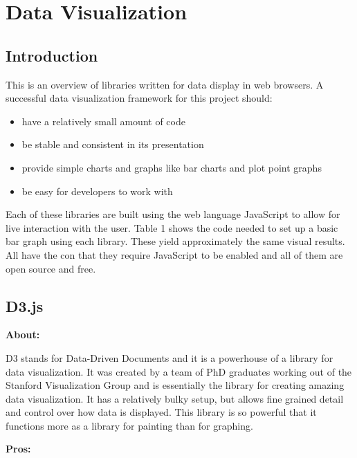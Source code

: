 \documentclass[draftclsnofoot,onecolumn,letterpaper,10pt,compsoc]{IEEEtran}
\begin{document}
\section{Data Visualization}
  \subsection{Introduction}
      This is an overview of libraries written for data display in web browsers.
      A successful data visualization framework for this project should:
      \begin{itemize}
        \item have a relatively small amount of code
        \item be stable and consistent in its presentation
        \item provide simple charts and graphs like bar charts and plot point graphs
        \item be easy for developers to work with
      \end{itemize}
      Each of these libraries are built using the web language JavaScript to allow for live interaction with the user.
      Table 1 shows the code needed to set up a basic bar graph using each library.
      These yield approximately the same visual results.
      All have the con that they require JavaScript to be enabled and all of them are open source and free.

  \subsection{D3.js}

    \textbf{About:}

    D3 stands for Data-Driven Documents and it is a powerhouse of a library for data visualization.\cite{d3.org}
    It was created by a team of PhD graduates working out of the Stanford Visualization Group and is essentially the library for creating amazing data visualization.\cite{d3Journal}
    It has a relatively bulky setup, but allows fine grained detail and control over how data is displayed.
    This library is so powerful that it functions more as a library for painting than for graphing.

    \noindent \textbf{Pros:}
\end{document}
